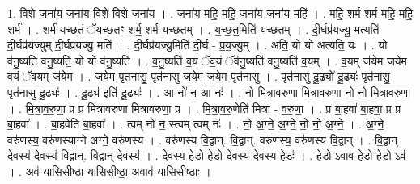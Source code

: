 \documentclass[17pt]{extarticle}
\begin{document}
1. वि॒शे जना॑य॒ जना॑य वि॒शे वि॒शे जना॑य । . जना॑य॒ महि॒ महि॒ जना॑य॒ जना॑य॒ महि॑ । . महि॒ शर्म॒ शर्म॒ महि॒ महि॒ शर्म॑ । . शर्म॑ यच्छतं ॅयच्छतꣳ॒॒ शर्म॒ शर्म॑ यच्छतम् । . य॒च्छ॒त॒मिति॑ यच्छतम् । . दी॒र्घप्र॑यज्यु॒ मत्यति॑ दी॒र्घप्र॑यज्युम् दी॒र्घप्र॑यज्यु॒ मति॑ । . दी॒र्घप्र॑यज्यु॒मिति॑ दी॒र्घ - प्र॒य॒ज्यु॒म् । . अति॒ यो यो अत्यति॒ यः । . यो व॑नु॒ष्यति॑ वनु॒ष्यति॒ यो यो व॑नु॒ष्यति॑ । . व॒नु॒ष्यति॑ व॒यं ॅव॒यं ॅव॑नु॒ष्यति॑ वनु॒ष्यति॑ व॒यम् । . व॒यम् ज॑येम जयेम व॒यं ॅव॒यम् ज॑येम । . ज॒ये॒म॒ पृत॑नासु॒ पृत॑नासु जयेम जयेम॒ पृत॑नासु । . पृत॑नासु दू॒ढ्यो॑ दू॒ढ्यः॑ पृत॑नासु॒ पृत॑नासु दू॒ढ्यः॑ । . दू॒ढ्य॑ इति॑ दू॒ढ्यः॑ । . आ नो॑ न॒ आ नः॑ । . नो॒ मि॒त्रा॒व॒रु॒णा॒ मि॒त्रा॒व॒रु॒णा॒ नो॒ नो॒ मि॒त्रा॒व॒रु॒णा॒ । . मि॒त्रा॒व॒रु॒णा॒ प्र प्र मि॑त्रावरुणा मित्रावरुणा॒ प्र । . मि॒त्रा॒व॒रु॒णेति॑ मित्रा - व॒रु॒णा॒ । . प्र बा॒हवा॑ बा॒हवा॒ प्र प्र बा॒हवा᳚ । . बा॒हवेति॑ बा॒हवा᳚ । . त्वम् नो॑ न॒ स्त्वम् त्वम् नः॑ । . नो॒ अ॒ग्ने॒ अ॒ग्ने॒ नो॒ नो॒ अ॒ग्ने॒ । . अ॒ग्ने॒ वरु॑णस्य॒ वरु॑णस्याग्ने अग्ने॒ वरु॑णस्य । . वरु॑णस्य वि॒द्वान्. वि॒द्वान्. वरु॑णस्य॒ वरु॑णस्य वि॒द्वान् । . वि॒द्वान् दे॒वस्य॑ दे॒वस्य॑ वि॒द्वान्. वि॒द्वान् दे॒वस्य॑ । . दे॒वस्य॒ हेडो॒ हेडो॑ दे॒वस्य॑ दे॒वस्य॒ हेडः॑ । . हेडो ऽवाव॒ हेडो॒ हेडो ऽव॑ । . अव॑ यासिसीष्ठा यासिसीष्ठा॒ अवाव॑ यासिसीष्ठाः । \newline
\end{document}
